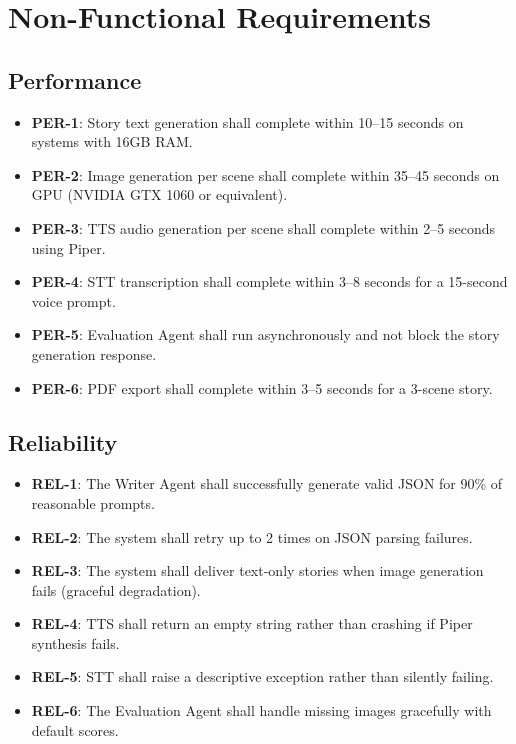 \section{Non-Functional Requirements}

\subsection{Performance}
\begin{itemize}
    \item \textbf{PER-1}: Story text generation shall complete within 10--15 seconds on systems with 16GB RAM.
    \item \textbf{PER-2}: Image generation per scene shall complete within 35--45 seconds on GPU (NVIDIA GTX 1060 or equivalent).
    \item \textbf{PER-3}: TTS audio generation per scene shall complete within 2--5 seconds using Piper.
    \item \textbf{PER-4}: STT transcription shall complete within 3--8 seconds for a 15-second voice prompt.
    \item \textbf{PER-5}: Evaluation Agent shall run asynchronously and not block the story generation response.
    \item \textbf{PER-6}: PDF export shall complete within 3--5 seconds for a 3-scene story.
\end{itemize}

\subsection{Reliability}
\begin{itemize}
    \item \textbf{REL-1}: The Writer Agent shall successfully generate valid JSON for 90\% of reasonable prompts.
    \item \textbf{REL-2}: The system shall retry up to 2 times on JSON parsing failures.
    \item \textbf{REL-3}: The system shall deliver text-only stories when image generation fails (graceful degradation).
    \item \textbf{REL-4}: TTS shall return an empty string rather than crashing if Piper synthesis fails.
    \item \textbf{REL-5}: STT shall raise a descriptive exception rather than silently failing.
    \item \textbf{REL-6}: The Evaluation Agent shall handle missing images gracefully with default scores.
\end{itemize}


